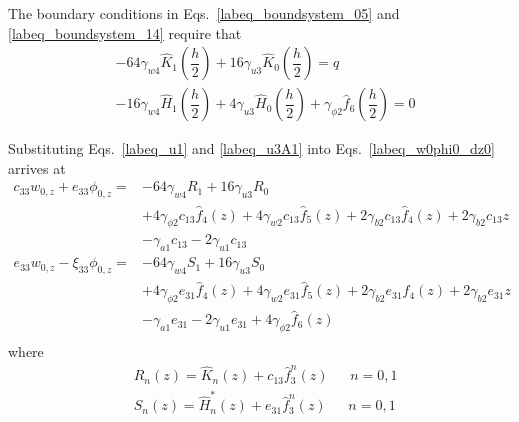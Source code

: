 \documentclass[12pt,sort&compress,fleqn,3p]{elsarticle}
\newcommand{\de}[5]{{#1}_{#2}{#3}_{{#4},{#5}}}
\begin{document}
The boundary conditions in Eqs.~\eqref{labeq_boundsystem_05} and \eqref{labeq_boundsystem_14} require that
\begin{equation}\label{labeq_w4u3phi2_constrain}
\begin{split}
&-64\gamma_{w4}\hat{K}_{1}(\dfrac{h}{2})+16\gamma_{u3}\hat{K}_{0}(\dfrac{h}{2}) =  q\\
&-16\gamma_{w4}\hat{H}_{1}(\dfrac{h}{2})+4\gamma_{u3}\hat{H}_{0}(\dfrac{h}{2})+\gamma_{\phi2}\hat{f}_6(\dfrac{h}{2}) = 0
\end{split}
\end{equation}




Substituting Eqs.~\eqref{labeq_u1} and \eqref{labeq_u3A1}   into Eqs.~\eqref{labeq_w0phi0_dz0} arrives at
\begin{equation}\label{labeq_w0phi0_z}
\begin{split}
\de{c}{33}{w}{0}{z}+\de{e}{33}{\phi}{0}{z}= &-64\gamma_{w4}R_{1}+16\gamma_{u3}R_{0}\\
& +4\gamma_{\phi2}c_{13}\hat{f}_4(z) + 4\gamma_{w2}c_{13}\hat{f}_5(z)  + 2\gamma_{b2}c_{13}\hat{f}_4(z)+ 2 \gamma_{b2} c_{13}z  \\
&-\gamma_{a1} c_{13} - 2\gamma_{u1}c_{13}\\
\de{e}{33}{w}{0}{z}-\de{\xi}{33}{\phi}{0}{z}=&-64\gamma_{w4}S_{1}+16\gamma_{u3}S_{0}\\
& +4\gamma_{\phi2}e_{31}\hat{f}_4(z) + 4\gamma_{w2}e_{31}\hat{f}_5(z)  + 2\gamma_{b2}e_{31}\hat{f}_4(z)+ 2\gamma_{b2}e_{31}z  \\
&-\gamma_{a1}e_{31} - 2\gamma_{u1}e_{31}+4\gamma_{\phi2}\hat{f}_6(z)\\
\end{split}
\end{equation}
where
\begin{equation}\label{labeq_RSTO_define}
\begin{split}
&R_{n}(z)=\hat{K}_{n}(z)+c_{13}\hat{f}^n_{3}(z) ~~~~~~~n=0,1\\
&S_{n}(z)=\hat{H}_{n}^{*}(z)+e_{31}\hat{f}^n_{3}(z)~~~~~~~n=0,1\\
\end{split}
\end{equation}
\end{document}
